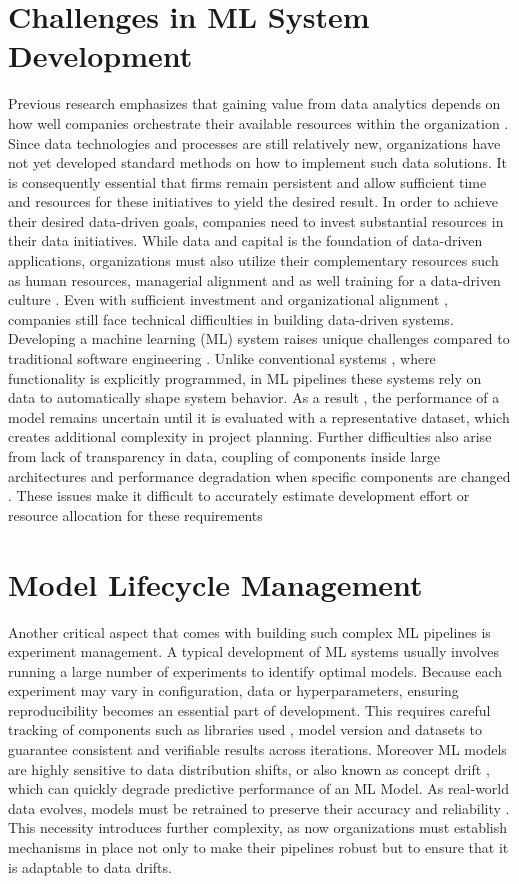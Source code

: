 %
%
\section{Challenges in ML System Development}
\label{sec:intro:goal}
Previous research emphasizes that gaining value from data analytics depends on how well companies orchestrate their available resources within the organization \cite{gupta:2016}. Since data technologies and processes are still relatively new, organizations have not yet developed standard methods on how to implement such data solutions. It is consequently essential that firms remain persistent and allow sufficient time and resources for these initiatives to yield the desired result. In order to achieve their desired data-driven goals, companies need to invest substantial resources in their data initiatives. While data and capital is the foundation of data-driven applications, organizations must also utilize their complementary resources such as human resources, managerial alignment and as well training for a data-driven culture \cite{gupta:2016}. Even with sufficient investment and organizational alignment , companies still face technical difficulties in building data-driven systems. Developing a machine learning (ML) system raises unique challenges compared to traditional software engineering \cite{arpteg:2018}. Unlike conventional systems , where functionality is explicitly programmed, in ML pipelines these systems rely on data to automatically shape system behavior. As a result , the performance of a model remains uncertain until it is evaluated with a representative dataset, which creates additional complexity in project planning. Further difficulties also arise from lack of transparency in data, coupling of components inside large architectures and performance degradation when specific components are changed \cite{giray:2021}. These issues make it difficult to accurately estimate development effort or resource allocation for these requirements

\section{Model Lifecycle Management}
\label{sec:intro:lifecycle}
Another critical aspect that comes with building such complex ML pipelines is experiment management. A typical development of ML systems usually involves running a large number of experiments to identify optimal models. Because each experiment may vary in configuration, data or hyperparameters, ensuring reproducibility becomes an essential part of development. This requires careful tracking of components such as libraries used , model version and datasets to guarantee consistent and verifiable results across iterations. Moreover ML models are highly sensitive to data distribution shifts, or also known as concept drift , which can quickly degrade predictive performance of an ML Model. As real-world data evolves, models must be retrained to preserve their accuracy and reliability \cite{steidl:2023}. This necessity introduces further complexity, as now organizations must establish mechanisms in place not only to make their pipelines robust but to ensure that it is adaptable to data drifts.

